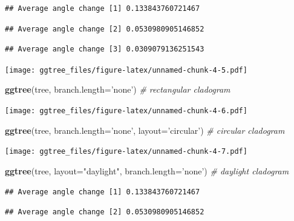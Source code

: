 \documentclass[]{article}
\newenvironment{Shaded}{\begin{snugshade}}{\end{snugshade}}
\newcommand{\KeywordTok}[1]{\textcolor[rgb]{0.13,0.29,0.53}{\textbf{#1}}}
\newcommand{\DataTypeTok}[1]{\textcolor[rgb]{0.13,0.29,0.53}{#1}}
\newcommand{\StringTok}[1]{\textcolor[rgb]{0.31,0.60,0.02}{#1}}
\newcommand{\CommentTok}[1]{\textcolor[rgb]{0.56,0.35,0.01}{\textit{#1}}}
\newcommand{\NormalTok}[1]{#1}
\begin{document}
\begin{verbatim}
## Average angle change [1] 0.133843760721467
\end{verbatim}

\begin{verbatim}
## Average angle change [2] 0.0530980905146852
\end{verbatim}

\begin{verbatim}
## Average angle change [3] 0.0309079136251543
\end{verbatim}

\texttt{[image: ggtree\_files/figure-latex/unnamed-chunk-4-5.pdf]}

\begin{Shaded}
\begin{Highlighting}[]
\KeywordTok{ggtree}\NormalTok{(tree, }\DataTypeTok{branch.length=}\StringTok{'none'}\NormalTok{) }\CommentTok{# rectangular cladogram}
\end{Highlighting}
\end{Shaded}

\texttt{[image: ggtree\_files/figure-latex/unnamed-chunk-4-6.pdf]}

\begin{Shaded}
\begin{Highlighting}[]
\KeywordTok{ggtree}\NormalTok{(tree, }\DataTypeTok{branch.length=}\StringTok{'none'}\NormalTok{, }\DataTypeTok{layout=}\StringTok{'circular'}\NormalTok{) }\CommentTok{# circular cladogram}
\end{Highlighting}
\end{Shaded}

\texttt{[image: ggtree\_files/figure-latex/unnamed-chunk-4-7.pdf]}

\begin{Shaded}
\begin{Highlighting}[]
\KeywordTok{ggtree}\NormalTok{(tree, }\DataTypeTok{layout=}\StringTok{"daylight"}\NormalTok{, }\DataTypeTok{branch.length=}\StringTok{'none'}\NormalTok{) }\CommentTok{# daylight cladogram}
\end{Highlighting}
\end{Shaded}

\begin{verbatim}
## Average angle change [1] 0.133843760721467
\end{verbatim}

\begin{verbatim}
## Average angle change [2] 0.0530980905146852
\end{verbatim}
\end{document}
